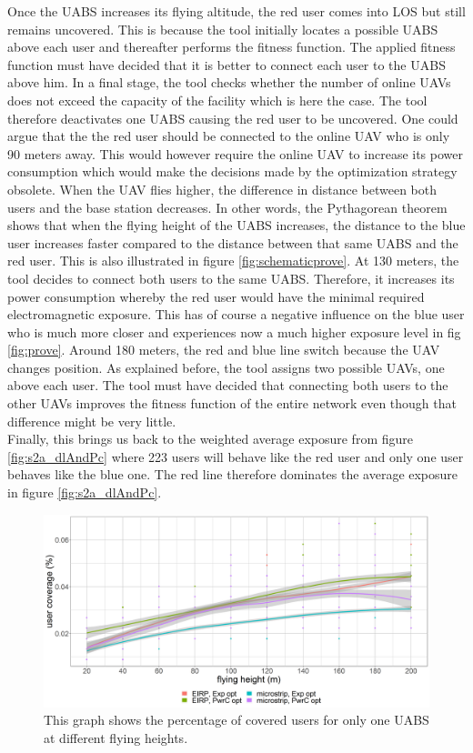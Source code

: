 Once the \gls{UABS} increases its flying altitude, the red user comes into \gls{LOS} but still remains uncovered. This is because the tool initially locates a possible 
\gls{UABS} above each user and thereafter performs the  fitness function. The applied fitness function must have decided that it is better to connect 
each user to the \gls{UABS} above him. In a final stage, the tool checks whether the number of online \gls{UAV}s does not exceed the capacity of the facility
which is here the case. The tool therefore deactivates one \gls{UABS} causing the red user to be uncovered. One could argue that the 
the red user should be connected to the online \gls{UAV} who is only 90 meters away. This would however require the online \gls{UAV} to increase its power consumption which 
would make the decisions made by the optimization strategy obsolete.
When the \gls{UAV} flies higher, the difference in distance between both users and the base station decreases. In other words, the Pythagorean theorem shows that when the flying height of the 
\gls{UABS} increases, the distance to the blue user increases faster compared to the distance between that same \gls{UABS} and the red user. This is also illustrated in 
figure \ref{fig:schematicprove}.
At 130 meters, the tool decides to connect both users to the same \gls{UABS}. Therefore, it increases its power consumption whereby the red user would  have the minimal 
required electromagnetic exposure. This has of course a negative influence on the blue user who is much more closer and experiences now a much higher exposure level in fig \ref{fig:prove}.
Around 180 meters, the  red and blue line switch because the \gls{UAV} changes position. As explained before, the tool assigns two possible \gls{UAV}s, one above 
each user. The tool must have decided that connecting both users to the other \gls{UAV}s improves the fitness function of the entire network even though that difference might be 
very little. \\
Finally, this brings us back to the weighted average exposure from figure \ref{fig:s2a_dlAndPc} where 223 users will behave like the  red user and only
one user behaves like the blue one. 
The red line therefore dominates the average exposure in figure \ref{fig:s2a_dlAndPc}.

\begin{figure}[h]
  \includegraphics[width=\textwidth]{../results/s2/fhvscov.png}
  \caption{This graph shows the percentage of covered users for only one \gls{UABS} at different flying heights.}
  \label{fig:s2fhvscov}
\end{figure}

